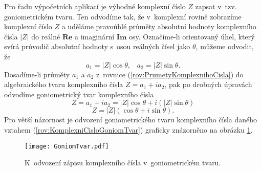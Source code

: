 Pro řadu výpočetních aplikací je výhodné komplexní číslo $Z$ zapsat v~tzv. goniometrickém tvaru. Ten odvodíme tak, že v~komplexní rovině zobrazíme komplexní číslo $Z$ a uděláme pravoúhlé průměty absolutní hodnoty komplexního čísla $|Z|$ do reálné $\mathbf{Re}$ a imaginární $\mathbf{Im}$ osy. Označíme-li orientovaný úhel, který svírá průvodič absolutní hodnoty s~osou reálných čísel jako $\theta$, můžeme odvodit, že 
\begin{equation}
a_1 = |Z| \cos \theta \mbox{,} \quad a_2 = |Z| \sin \theta \mbox{.}
\label{rov:PrumetyKomplexnihoCisla}
\end{equation}
Dosadíme-li průměty $a_1$ a $a_2$ z~rovnice (\ref{rov:PrumetyKomplexnihoCisla}) do algebraického tvaru komplexního čísla $Z = a_1 + ia_2$, pak po drobných úpravách odvodíme goniometrický tvar komplexního čísla
\begin{displaymath}
Z = a_1 + ia_2 = |Z| \cos \theta + i (|Z| \sin \theta)
\end{displaymath}
\begin{equation}
Z = |Z| (\cos \theta + i\sin \theta) \mbox{.}
\label{rov:KomplexniCisloGoniomTvar}
\end{equation}
Pro větší názornost je odvození goniometrického tvaru komplexního čísla daného vztahem (\ref{rov:KomplexniCisloGoniomTvar}) graficky znázorněno na obrázku  \ref{obr:GoniometrickyTvar}.
\begin{figure} [ht]
\centering
\texttt{[image: GoniomTvar.pdf]}
\caption[Goniometrický tvar komplexního čísla]{K~odvození zápisu komplexního čísla v~goniometrickém tvaru.}
\label{obr:GoniometrickyTvar}
\end{figure}

